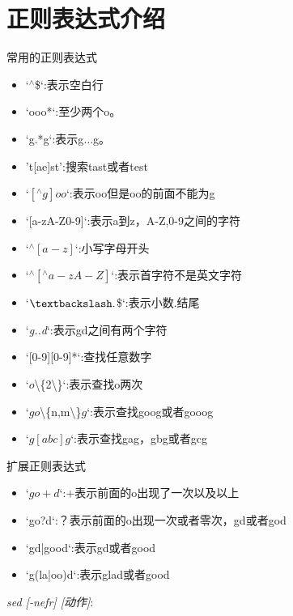 \section{正则表达式介绍}
常用的正则表达式
\begin{itemize}
\item `${}^\wedge$\$`:表示空白行
\item `ooo*`:至少两个o。
\item `g.*g`:表示g$\ldots$g。
\item 't[ae]st':搜索tast或者test
\item `$[{}^\wedge g]oo$`:表示oo但是oo的前面不能为g
\item `[a-zA-Z0-9]`:表示a到z，A-Z,0-9之间的字符
\item `${}^\wedge[a-z]$`:小写字母开头
\item `${}^{\wedge}{}[{}^\wedge{}a-zA-Z]$`:表示首字符不是英文字符
\item `$\textbackslash.$\$`:表示小数.结尾
\item `\textit{g..d}`:表示gd之间有两个字符
\item `[0-9][0-9]*`:查找任意数字
\item `$o$\textbackslash\{2\textbackslash\}`:表示查找o两次
\item `$go$\textbackslash\{n,m\textbackslash\}$g$`:表示查找goog或者gooog
\item `$g[abc]g$`:表示查找gag，gbg或者gcg
\end{itemize}
扩展正则表达式
\begin{itemize}
\item `$go+d$`:+表示前面的o出现了一次以及以上
\item `go?d`:？表示前面的o出现一次或者零次，gd或者god
\item `gd|good`:表示gd或者good
\item `g(la|oo)d`:表示glad或者good
\end{itemize}
\textit{sed [-nefr] [动作]}:

